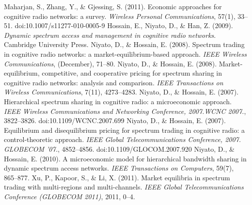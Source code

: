 \begin{thebibliography}{1}
 Maharjan, S., Zhang, Y., \& Gjessing, S. (2011). Economic approaches for cognitive radio networks: a survey. \textit{Wireless Personal Communications}, 57(1), 33–51. doi:10.1007/s11277-010-0005-9
 Hossain, E., Niyato, D., \& Han, Z. (2009). \textit{Dynamic spectrum access and management in cognitive radio networks}. Cambridge University Press.
 Niyato, D., \& Hossain, E. (2008). Spectrum trading in cognitive radio networks: a market-equilibrium-based approach.\textit{ IEEE Wireless Communications}, (December), 71–80.
 Niyato, D., \& Hossain, E. (2008). Market-equilibrium, competitive, and cooperative pricing for spectrum sharing in cognitive radio networks: analysis and comparison. \textit{IEEE Transactions on Wireless Communications}, 7(11), 4273–4283. 
 Niyato, D., \& Hossain, E. (2007). Hierarchical spectrum sharing in cognitive radio: a microeconomic approach. \textit{IEEE Wireless Communications and Networking Conference, 2007.WCNC 2007.}, 3822–3826. doi:10.1109/WCNC.2007.699
 Niyato, D., \& Hossain, E. (2007). Equilibrium and disequilibrium pricing for spectrum trading in cognitive radio: a control-theoretic approach. \textit{IEEE Global Telecommunications Conference, 2007. GLOBECOM  ’07.}, 4852–4856. doi:10.1109/GLOCOM.2007.920
 Niyato, D., \& Hossain, E. (2010). A microeconomic model for hierarchical bandwidth sharing in dynamic spectrum access networks. \textit{IEEE Transactions on Computers}, 59(7), 865–877.
 Xu, P., Kapoor, S., \& Li, X. (2011). Market equilibria in spectrum trading with multi-regions and multi-channels. \textit{IEEE Global Telecommunications Conference (GLOBECOM 2011)}, 2011, 0–4.


\end{thebibliography}
